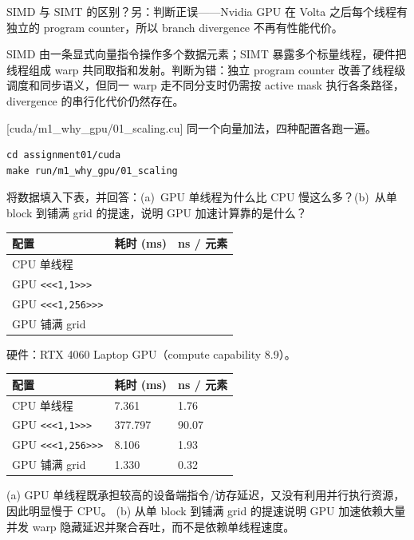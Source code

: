 \documentclass[11pt,a4paper,fontset=fandol]{ctexart}
\begin{document}
SIMD 与 SIMT 的区别？另：判断正误——Nvidia GPU 在 Volta 之后每个线程有独立的 program counter，所以 branch divergence 不再有性能代价。

\begin{answer}
SIMD 由一条显式向量指令操作多个数据元素；SIMT 暴露多个标量线程，硬件把
线程组成 warp 共同取指和发射。判断为错：独立 program counter 改善了线程级
调度和同步语义，但同一 warp 走不同分支时仍需按 active mask 执行各条路径，
divergence 的串行化代价仍然存在。
\end{answer}

[cuda/m1\_why\_gpu/01\_scaling.cu]
同一个向量加法，四种配置各跑一遍。

\begin{lstlisting}
cd assignment01/cuda
make run/m1_why_gpu/01_scaling
\end{lstlisting}

将数据填入下表，并回答：(a)~GPU 单线程为什么比 CPU 慢这么多？(b)~从单 block 到铺满 grid 的提速，说明 GPU 加速计算靠的是什么？

\begin{center}\small
\begin{tabular}{@{}lll@{}}
\toprule
配置 & 耗时 (ms) & ns / 元素 \\
\midrule
CPU 单线程 & & \\
GPU \texttt{<<<1,1>>>} & & \\
GPU \texttt{<<<1,256>>>} & & \\
GPU 铺满 grid & & \\
\bottomrule
\end{tabular}
\end{center}

\begin{answer}
硬件：RTX 4060 Laptop GPU（compute capability 8.9）。
\begin{center}\small
\begin{tabular}{@{}lll@{}}
\toprule
配置 & 耗时 (ms) & ns / 元素 \\
\midrule
CPU 单线程 & 7.361 & 1.76 \\
GPU \texttt{<<<1,1>>>} & 377.797 & 90.07 \\
GPU \texttt{<<<1,256>>>} & 8.106 & 1.93 \\
GPU 铺满 grid & 1.330 & 0.32 \\
\bottomrule
\end{tabular}
\end{center}
(a) GPU 单线程既承担较高的设备端指令/访存延迟，又没有利用并行执行资源，
因此明显慢于 CPU。 (b) 从单 block 到铺满 grid 的提速说明 GPU 加速依赖大量
并发 warp 隐藏延迟并聚合吞吐，而不是依赖单线程速度。
\end{answer}
\end{document}
